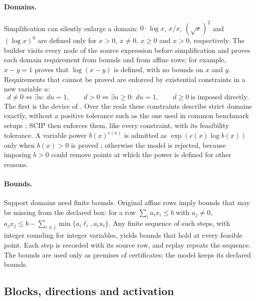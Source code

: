 \paragraph{Domains.}
Simplification can silently enlarge a domain: $0\cdot\log x$, $x/x$,
$(\sqrt x)^2$ and $(\log x)^0$ are defined only for $x>0$, $x\ne0$, $x\ge0$
and $x>0$, respectively. The builder visits every node of the source
expression before simplification and proves each domain requirement from
bounds and from affine rows; for example, $x-y=1$ proves that $\log(x-y)$ is
defined, with no bounds on $x$ and $y$. Requirements that cannot be proved
are enforced by existential constraints in a new variable $u$:
\[
d\ne0\iff\exists u:\ du=1,\qquad d>0\iff\exists u\ge0:\ du=1,\qquad d\ge0\ \text{is imposed directly.}
\]
The first is the device of \citet{Rabinowitsch1930}. Over the reals these
constraints describe strict domains exactly, without a positive tolerance
such as the one used in common benchmark setups \citep{BestuzhevaEtAl2025};
SCIP then enforces them, like every constraint, with its feasibility
tolerance. A variable power $b(x)^{e(x)}$ is admitted as $\exp(e(x)\log b(x))$
only when $b(x)>0$ is proved \citep[compare][]{BelottiEtAl2009}; otherwise
the model is rejected, because imposing $b>0$ could remove points at which
the power is defined for other reasons.

\paragraph{Bounds.}
Support domains need finite bounds. Original affine rows imply bounds that
may be missing from the declared box: for a row $\sum_ia_ix_i\le b$ with
$a_j\ne0$, $a_jx_j\le b-\sum_{i\ne j}\min\{a_i\ell_i,a_iu_i\}$. Any finite
sequence of such steps, with integer rounding for integer variables, yields
bounds that hold at every feasible point. Each step is recorded with its
source row, and replay repeats the sequence. The bounds are used only as
premises of certificates; the model keeps its declared bounds.

\subsection{Blocks, directions and activation}\label{sec:blocks}

